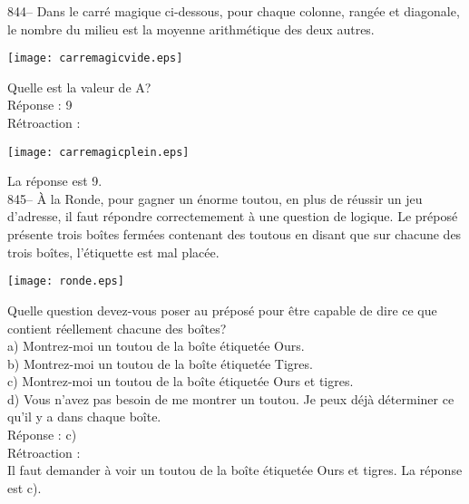 ﻿\documentclass[letterpaper, 12pt]{article}
\begin{document}
844-- Dans le carr\'e magique ci-dessous, pour chaque colonne, rang\'ee et
diagonale, le nombre du milieu est la moyenne arithm\'etique des deux
autres.    \begin{center}
    \texttt{[image: carremagicvide.eps]}
    \end{center}
Quelle est la valeur de A?\\

R\'eponse : 9\\

R\'etroaction : \\

    \begin{center}
    \texttt{[image: carremagicplein.eps]}
    \end{center}


La r\'eponse est 9.\\

845-- \`A la Ronde, pour gagner un \'enorme toutou, en plus de
r\'eussir un jeu d'adresse, il faut r\'epondre correctemement \`a
une question de logique.  Le pr\'epos\'e pr\'esente trois bo\^ites
ferm\'ees contenant des toutous en disant que sur chacune des trois
bo\^ites, l'\'etiquette est mal plac\'ee.
    \begin{center}
    \texttt{[image: ronde.eps]}
    \end{center}
Quelle question devez-vous poser au pr\'epos\'e pour \^etre capable de dire
ce que contient r\'eellement chacune des bo\^ites?\\
a) Montrez-moi un toutou de la bo\^ite \'etiquet\'ee \og Ours\fg .\\
b) Montrez-moi un toutou de la bo\^ite \'etiquet\'ee \og Tigres\fg .\\
c) Montrez-moi un toutou de la bo\^ite \'etiquet\'ee \og Ours et tigres\fg.\\
d) Vous n'avez pas besoin de me montrer un toutou.  Je peux d\'ej\`a
d\'eterminer ce qu'il y a dans chaque bo\^ite.\\

R\'eponse : c)\\

R\'etroaction : \\
Il faut demander \`a voir un toutou de la bo\^ite \'etiquet\'ee \og
Ours et tigres\fg.  La r\'eponse est c).\\
\end{document}
